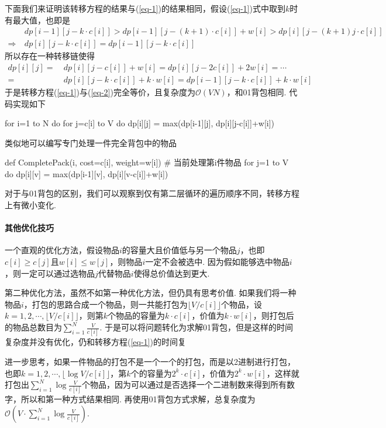 \documentclass[12pt, a4paper, oneside]{ctexart}
\numberwithin{equation}{section}  %
\let\leq=\leqslant %
\let\geq=\geqslant %
\def\O{\mathcal{O}}         %
\begin{document}
下面我们来证明该转移方程的结果与(\ref{eq-1})的结果相同，假设(\ref{eq-1})式中取到$k$时有最大值，也即是
\begin{align*}
    &\ dp[i-1][j-k\cdot c[i]] > dp[i-1][j-(k+1)\cdot c[i]]+w[i] > dp[i][j-(k+1)j\cdot c[i]]\\
    \Rightarrow&\ dp[i][j-k\cdot c[i]] = dp[i-1][j-k\cdot c[i]]
\end{align*}
所以存在一种转移链使得
\begin{align*}
    dp[i][j] =&\ dp[i][j-c[i]] + w[i] = dp[i][j-2c[i]]+2w[i] =\cdots\\
    =&\  dp[i][j-k\cdot c[i]]+k\cdot w[i] = dp[i-1][j-k\cdot c[i]] + k\cdot w[i]
\end{align*}
于是转移方程(\ref{eq-1})与(\ref{eq-2})完全等价，且复杂度为$\O(VN)$，和01背包相同. 代码实现如下
\begin{pythoncode}
for i=1 to N do
    for j=c[i] to V do
        dp[i][j] = max(dp[i-1][j], dp[i][j-c[i]]+w[i])
\end{pythoncode}
类似地可以编写专门处理一件完全背包中的物品
\begin{pythoncode}
def CompletePack(i, cost=c[i], weight=w[i])  # 当前处理第i件物品
    for j=1 to V do
        dp[i][v] = max(dp[i-1][v], dp[i][v-c[i]]+w[i])
\end{pythoncode}
对于与01背包的区别，我们可以观察到仅有第二层循环的遍历顺序不同，转移方程上有微小变化.

\paragraph*{其他优化技巧}
一个直观的优化方法，假设物品$i$的容量大且价值低与另一个物品$j$，也即$c[i]\geq c[j]$且$w[i] \leq w[j]$，则物品$i$一定不会被选中. 因为假如能够选中物品$i$，则一定可以通过选物品$j$代替物品$i$使得总价值达到更大.

第二种优化方法，虽然不如第一种优化方法，但仍具有思考价值. 如果我们将一种物品$i$，打包的思路合成一个物品，则一共能打包为$\lfloor V/c[i] \rfloor$个物品，设$k=1,2,\cdots, \lfloor V/c[i] \rfloor$，则第$k$个物品的容量为$k\cdot c[i]$，价值为$k\cdot w[i]$，则打包后的物品总数目为$\sum_{i=1}^N\frac{V}{c[i]}$. 于是可以将问题转化为求解01背包，但是这样的时间复杂度并没有优化，仍和转移方程(\ref{eq-1})的时间复

进一步思考，如果一件物品的打包不是一个一个的打包，而是以2进制进行打包，也即$k=1,2,\cdots, \lfloor\log V/c[i]\rfloor$，第$k$个的容量为$2^k\cdot c[i]$，价值为$2^k\cdot w[i]$，这样就打包出$\sum_{i=1}^N\log \frac{V}{c[i]}$个物品，因为可以通过是否选择一个二进制数来得到所有数字，所以和第一种方式结果相同. 再使用01背包方式求解，总复杂度为$\O(V\cdot \sum_{i=1}^N\log \frac{V}{c[i]})$.
\end{document}
